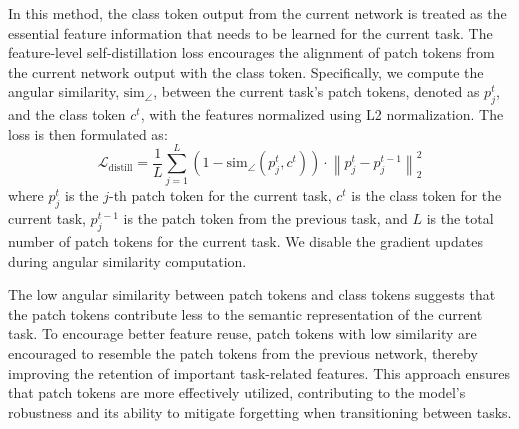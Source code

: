 In this method, the class token output from the current network is treated as the essential feature information that needs to be learned for the current task. The feature-level self-distillation loss encourages the alignment of patch tokens from the current network output with the class token. Specifically, we compute the angular similarity, $\text{sim}_{\angle
}$, between the current task's patch tokens, denoted as \( p_j^t \), and the class token \( c^t \), with the features normalized using L2 normalization. The loss is then formulated as:
\begin{equation}
    \mathcal{L}_{\text{distill}} = \frac{1}{L} \sum_{j=1}^{L} \left( 1 - \text{sim}_{\angle
}(p_j^t, c^t) \right) \cdot \left\| p_j^t - p_j^{t-1} \right\|_2^2 
\end{equation}
where \( p_j^t \) is the \( j \)-th patch token for the current task, \( c^t \) is the class token for the current task, \( p_j^{t-1} \) is the patch token from the previous task, and \( L \) is the total number of patch tokens for the current task. We disable the gradient updates during angular similarity computation.

The low angular similarity between patch tokens and class tokens suggests that the patch tokens contribute less to the semantic representation of the current task. To encourage better feature reuse, patch tokens with low similarity are encouraged to resemble the patch tokens from the previous network, thereby improving the retention of important task-related features. This approach ensures that patch tokens are more effectively utilized, contributing to the model's robustness and its ability to mitigate forgetting when transitioning between tasks.


